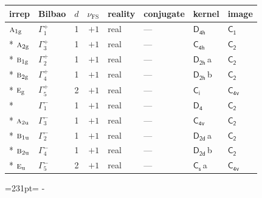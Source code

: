 \documentclass[10pt,a4paper]{article}
\newcommand{\needspace}[1]{\par\penalty-100\begingroup\dimen0=#1\relax\dimen2=\pagegoal
  \advance\dimen2-\pagetotal\ifdim\dimen0>\dimen2\relax\ifdim\dimen2>0pt\vfil\break\fi\fi
  \endgroup}
\numberwithin{equation}{section}
\newcommand{\grp}[1]{\mathsf{#1}}
\newcommand{\irr}[1]{\text{\normalfont\scshape #1}}
\newcommand{\detbox}[1]{{\setlength{\fboxsep}{1pt}\fbox{#1}}}
\newcommand{\ptag}[1]{\mathrm{#1}}
\newcommand{\clsletter}[1]{\,{\scriptsize\color{black!55}#1}}
\newcommand{\fsind}{\nu_{\mathrm{FS}}}
\begin{document}
{\small\renewcommand{\arraystretch}{1.25}\begin{longtable}{@{}llrrllll@{}}\toprule
irrep & Bilbao & $d$ & $\fsind$ & reality & conjugate & kernel & image\\\midrule\endhead
\bottomrule\endfoot\endlastfoot
$\irr{a}_{1\ptag{g}}$ & $\Gamma_{1}^{+}$ & 1 & $+1$ & real & --- & \href{D4h.pdf}{$\grp{D_{4h}}$} & \href{C1.pdf}{$\grp{C_{1}}$}\\*
$\irr{a}_{2\ptag{g}}$ & $\Gamma_{3}^{+}$ & 1 & $+1$ & real & --- & \href{C4h.pdf}{$\grp{C_{4h}}$} & \href{C2.pdf}{$\grp{C_{2}}$}\\*
$\irr{b}_{1\ptag{g}}$ & $\Gamma_{2}^{+}$ & 1 & $+1$ & real & --- & \href{D2h.pdf}{$\grp{D_{2h}}$}\clsletter{a} & \href{C2.pdf}{$\grp{C_{2}}$}\\*
$\irr{b}_{2\ptag{g}}$ & $\Gamma_{4}^{+}$ & 1 & $+1$ & real & --- & \href{D2h.pdf}{$\grp{D_{2h}}$}\clsletter{b} & \href{C2.pdf}{$\grp{C_{2}}$}\\*
$\irr{e}_{\ptag{g}}$ & $\Gamma_{5}^{+}$ & 2 & $+1$ & real & --- & \href{S2.pdf}{$\grp{C_{i}}$} & \href{C4v.pdf}{$\grp{C_{4v}}$}\\*
\detbox{$\irr{a}_{1\ptag{u}}$} & $\Gamma_{1}^{-}$ & 1 & $+1$ & real & --- & \href{D4.pdf}{$\grp{D_{4}}$} & \href{C2.pdf}{$\grp{C_{2}}$}\\*
$\irr{a}_{2\ptag{u}}$ & $\Gamma_{3}^{-}$ & 1 & $+1$ & real & --- & \href{C4v.pdf}{$\grp{C_{4v}}$} & \href{C2.pdf}{$\grp{C_{2}}$}\\*
$\irr{b}_{1\ptag{u}}$ & $\Gamma_{2}^{-}$ & 1 & $+1$ & real & --- & \href{D2d.pdf}{$\grp{D_{2d}}$}\clsletter{a} & \href{C2.pdf}{$\grp{C_{2}}$}\\*
$\irr{b}_{2\ptag{u}}$ & $\Gamma_{4}^{-}$ & 1 & $+1$ & real & --- & \href{D2d.pdf}{$\grp{D_{2d}}$}\clsletter{b} & \href{C2.pdf}{$\grp{C_{2}}$}\\*
$\irr{e}_{\ptag{u}}$ & $\Gamma_{5}^{-}$ & 2 & $+1$ & real & --- & \href{C1v.pdf}{$\grp{C_{s}}$}\clsletter{a} & \href{C4v.pdf}{$\grp{C_{4v}}$}\\
\bottomrule\end{longtable}}
\needspace{231pt}
\end{document}
